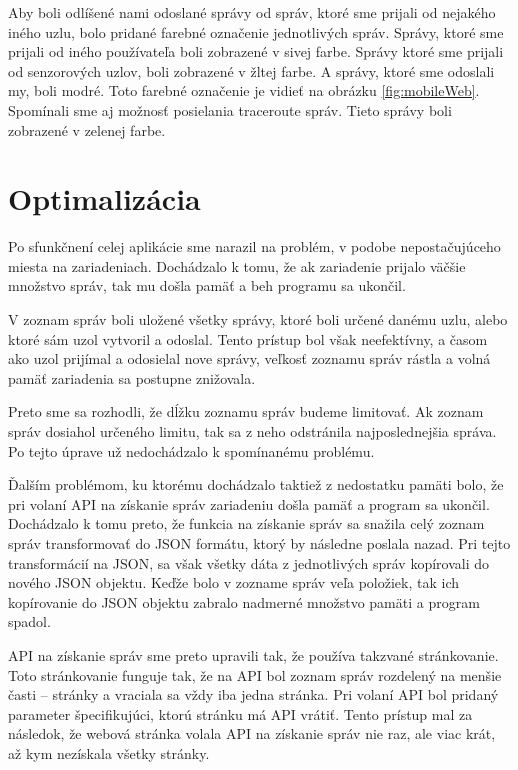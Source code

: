 \documentclass[slovak,master]{diploma}
\begin{document}
Aby boli odlíšené nami odoslané správy od správ, ktoré sme prijali od nejakého iného uzlu, bolo pridané farebné označenie jednotlivých správ. Správy, ktoré sme 
prijali od iného používateľa boli zobrazené v sivej farbe. Správy ktoré sme prijali od senzorových uzlov, boli zobrazené v žltej farbe. A správy, ktoré sme odoslali 
my, boli modré. Toto farebné označenie je vidieť na obrázku \ref{fig:mobileWeb}. Spomínali sme aj možnosť posielania traceroute správ. Tieto správy boli zobrazené v zelenej farbe.


\section{Optimalizácia}
Po sfunkčnení celej aplikácie sme narazil na problém, v podobe nepostačujúceho miesta na zariadeniach. Dochádzalo k tomu, že ak zariadenie prijalo 
väčšie množstvo správ, tak mu došla pamäť a beh programu sa ukončil.

V zoznam správ boli uložené všetky správy, ktoré boli určené danému uzlu, alebo ktoré sám uzol vytvoril a odoslal. Tento prístup bol však neefektívny, a časom ako 
uzol prijímal a odosielal nove správy, veľkosť zoznamu správ rástla a volná pamäť zariadenia sa postupne znižovala.

Preto sme sa rozhodli, že dĺžku zoznamu správ budeme limitovať. Ak zoznam správ dosiahol určeného limitu, tak sa z neho odstránila najposlednejšia správa.
Po tejto úprave už nedochádzalo k spomínanému problému.

Ďalším problémom, ku ktorému dochádzalo taktiež z nedostatku pamäti bolo, že pri volaní API na získanie správ zariadeniu došla pamäť a program sa ukončil.
Dochádzalo k tomu preto, že funkcia na získanie správ sa snažila celý zoznam správ transformovať do JSON formátu, ktorý by následne poslala nazad. Pri tejto transformácií 
na JSON, sa však všetky dáta z jednotlivých správ kopírovali do nového JSON objektu. Keďže bolo v zozname správ veľa položiek, tak ich kopírovanie do JSON objektu zabralo 
nadmerné množstvo pamäti a program spadol.

API na získanie správ sme preto upravili tak, že používa takzvané stránkovanie. Toto stránkovanie funguje tak, že na API bol zoznam správ rozdelený na menšie časti -- stránky a 
vraciala sa vždy iba jedna stránka. Pri volaní API bol pridaný parameter špecifikujúci, ktorú stránku má API vrátiť. Tento prístup mal za následok, že 
webová stránka volala API na získanie správ nie raz, ale viac krát, až kym nezískala všetky stránky.
\end{document}
